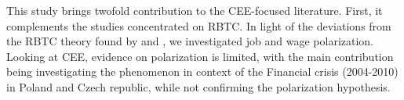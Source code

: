 \documentclass[11pt]{article}
\begin{document}


This study brings twofold contribution to the CEE-focused literature. First, it complements the studies concentrated on RBTC. In light of the deviations from the RBTC theory found by \citet{arendt2019technical} and \citet{hardy2018educational}, we investigated job and wage polarization.  Looking at CEE, evidence on polarization is limited, with the main contribution being \cite{mysikova2018personal} investigating the phenomenon in context of the Financial crisis (2004-2010) in Poland and Czech republic, while not confirming the polarization hypothesis.
\end{document}
